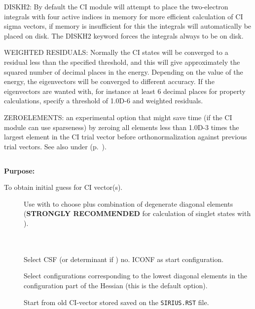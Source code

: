 
DISKH2: By default the CI module will attempt to place the two-electron
integrals with four active indices in memory for more efficient
calculation of CI sigma vectors, if memory is insufficient for this
the
integrals will automatically be placed on disk.  The DISKH2 keyword
forces the integrals always to be on disk.

WEIGHTED RESIDUALS:  Normally the CI states will be converged to a
residual less than the specified threshold, and this will give
approximately the squared number of decimal places in the energy.
Depending on the value of the energy, the eigenvectors will be converged
to different accuracy. If the eigenvectors are wanted with, for instance at
least 6 decimal places for property calculations, specify a threshold of
1.0D-6 and weighted residuals.

ZEROELEMENTS: an experimental option that might save time (if the CI
module can use sparseness) by zeroing all elements less than 1.0D-3
times the largest element in the CI trial vector before
orthonormalization against previous trial vectors.
See also  under 
(p.~\pageref{ref-optinp}).


\pagebreak[3]
\subsection{\label{ref-civinp}}

{\bf Purpose:}

To obtain initial guess for CI vector(s).

\begin{description}
\item[]
  Use with  to choose plus combination
  of degenerate diagonal elements ({\bf STRONGLY RECOMMENDED} for
  calculation of singlet states  with ).

\item[] \ \\
   \\
  Select CSF (or determinant if ) no.
  ICONF as start configuration.

\item[]
  Select configurations corresponding to the lowest diagonal elements in
  the configuration part of the Hessian (this is the default option).

\item[]
  Start from old CI-vector stored saved on the \verb|SIRIUS.RST| file.


\end{description}

